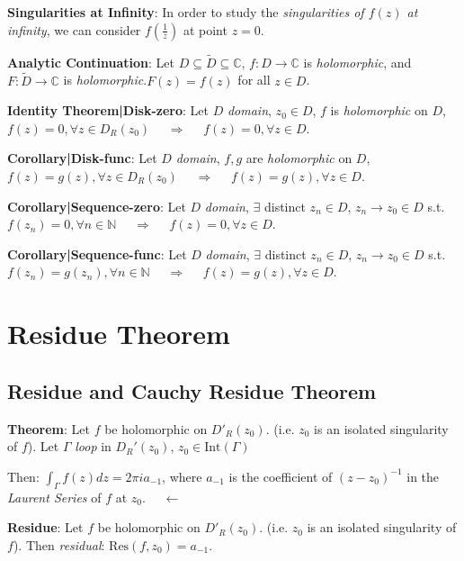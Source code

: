 \documentclass[9pt]{article}
\begin{document}
\star\textbf{Singularities at Infinity}: In order to study the \textit{singularities of $f(z)$ at infinity}, we can consider $f(\frac{1}{z})$ at point $z=0$.

\textbf{Analytic Continuation}: Let $D\subseteq\widetilde{D}\subseteq\mathbb{C}$, $f:D\to\mathbb{C}$ is \textit{holomorphic}, and $F:\widetilde{D}\to\mathbb{C}$ is \textit{holomorphic}.\quad $F(z)=f(z)$ for all $z\in D$.

\textbf{Identity Theorem|Disk-zero}: Let $D$ \textit{domain}, $z_0\in D$, $f$ is \textit{holomorphic} on $D$, $f(z)=0,\forall z\in D_{R}(z_0)$ \ \ $\Rightarrow$ \ \ $f(z)=0,\forall z\in D$.

\quad\textbf{Corollary|Disk-func}: Let $D$ \textit{domain}, $f,g$ are \textit{holomorphic} on $D$, $f(z)=g(z),\forall z\in D_{R}(z_0)$ \ \ $\Rightarrow$ \ \ $f(z)=g(z),\forall z\in D$.

\quad\textbf{Corollary|Sequence-zero}: Let $D$ \textit{domain}, $\exists$ distinct $z_n\in D$, $z_n\to z_0\in D$ s.t. $f(z_n)=0,\forall n\in\mathbb{N}$ \ \ $\Rightarrow$ \ \ $f(z)=0,\forall z\in D$.

\quad\textbf{Corollary|Sequence-func}: Let $D$ \textit{domain}, $\exists$ distinct $z_n\in D$, $z_n\to z_0\in D$ s.t. $f(z_n)=g(z_n),\forall n\in\mathbb{N}$ \ \ $\Rightarrow$ \ \ $f(z)=g(z),\forall z\in D$.


\section{Residue Theorem} %

\subsection{Residue and Cauchy Residue Theorem} %

\textbf{Theorem}: Let $f$ be holomorphic on $D'_{R}(z_0)$. {\scriptsize (i.e. $z_0$ is an isolated singularity of $f$)}. Let $\Gamma$ \textit{loop} in $D_{R}'(z_0)$, $z_0\in\text{Int}(\Gamma)$

\qquad\qquad\quad Then: $\int_{\Gamma}f(z)dz=2\pi i a_{-1}$, {\footnotesize where $a_{-1}$ is the coefficient of $(z-z_0)^{-1}$ in the \textit{Laurent Series} of $f$ at $z_0$.} \qquad \qquad \qquad \ \ $\leftarrow$

\textbf{Residue}: Let $f$ be holomorphic on $D'_{R}(z_0)$. {\scriptsize (i.e. $z_0$ is an isolated singularity of $f$)}. Then \textit{residual}: $\text{Res}(f,z_0)=a_{-1}$. 
\end{document}
